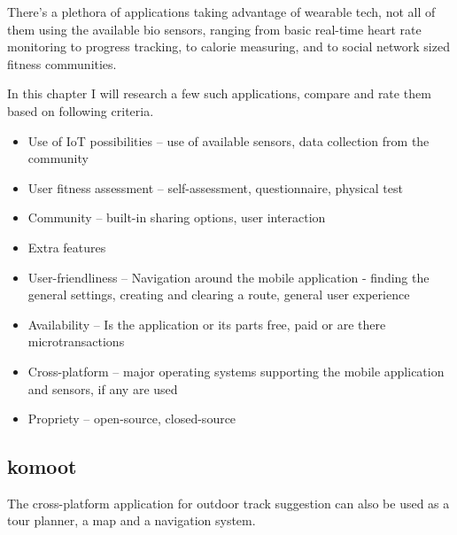 There's a plethora of applications taking advantage of wearable tech, not all of them using the available bio sensors, ranging from basic real-time heart rate monitoring to progress tracking, to calorie measuring, and to social network sized fitness communities.

In this chapter I will research a few such applications, compare and rate them based on following criteria. 
\begin{itemize}
    \item Use of IoT possibilities -- use of available sensors, data collection from the community
    \item User fitness assessment -- self-assessment, questionnaire, physical test
    \item Community -- built-in sharing options, user interaction
    \item Extra features
    \item User-friendliness -- Navigation around the mobile application - finding the general settings, creating and clearing a route, general user experience
    \item Availability -- Is the application or its parts free, paid or are there microtransactions
    \item Cross-platform -- major operating systems supporting the mobile application and sensors, if any are used
    \item Propriety -- open-source, closed-source
\end{itemize}


\subsection{komoot}
The cross-platform application for outdoor track suggestion can also be used as a tour planner, a map and a navigation system.


